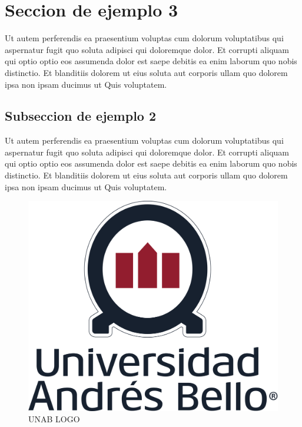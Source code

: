 \section{Seccion de ejemplo 3}
    Ut autem perferendis ea praesentium voluptas cum dolorum voluptatibus qui aspernatur fugit quo soluta adipisci qui doloremque dolor. Et corrupti aliquam qui optio optio eos assumenda dolor est saepe debitis ea enim laborum quo nobis distinctio. Et blanditiis dolorem ut eius soluta aut corporis ullam quo dolorem ipsa non ipsam ducimus ut Quis voluptatem.
    \subsection{Subseccion de ejemplo 2}
        Ut autem perferendis ea praesentium voluptas cum dolorum voluptatibus qui aspernatur fugit quo soluta adipisci qui doloremque dolor. Et corrupti aliquam qui optio optio eos assumenda dolor est saepe debitis ea enim laborum quo nobis distinctio. Et blanditiis dolorem ut eius soluta aut corporis ullam quo dolorem ipsa non ipsam ducimus ut Quis voluptatem.
        \newline
        \begin{figure}[ht]
            \centering
            \includegraphics[scale=1]{imgs/unabLogos/unabFrontPageLogo.png} 
            \caption{UNAB LOGO}
        \end{figure}
        \newline
       


